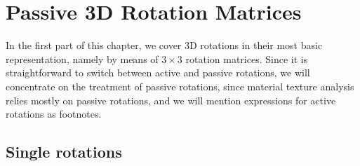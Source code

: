 


\section{Passive 3D Rotation Matrices}

In the first part of this chapter, we cover 3D rotations in their most basic representation, namely by means of $3\times 3$ rotation matrices. Since it is straightforward to switch between active and passive rotations, we will concentrate on the treatment of passive rotations, since material texture analysis relies mostly on passive rotations, and we will mention expressions for active rotations as footnotes.

\subsection{Single rotations}

